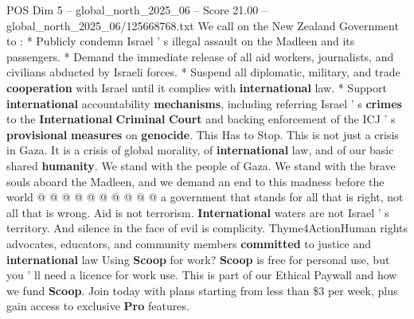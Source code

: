 \begin{textsample}{POS Dim 5 – global\_north\_2025\_06 – Score 21.00 – global\_north\_2025\_06/125668768.txt}
We call on the New Zealand Government to : * Publicly condemn Israel ' s illegal assault on the Madleen and its passengers. * Demand the immediate release of all aid workers, journalists, and civilians abducted by Israeli forces. * Suspend all diplomatic, military, and trade \textbf{cooperation} with Israel until it complies with \textbf{international} law. * Support \textbf{international} accountability \textbf{mechanisms}, including referring Israel ' s \textbf{crimes} to the \textbf{International} \textbf{Criminal} \textbf{Court} and backing enforcement of the ICJ ' s \textbf{provisional} \textbf{measures} on \textbf{genocide}.
This Has to Stop.
This is not just a crisis in Gaza.
It is a crisis of global morality, of \textbf{international} law, and of our basic shared \textbf{humanity}.
We stand with the people of Gaza.
We stand with the brave souls aboard the Madleen, and we demand an end to this madness before the world @ @ @ @ @ @ @ @ @ @ a government that stands for all that is right, not all that is wrong.
Aid is not terrorism. \textbf{International} waters are not Israel ' s territory.
And silence in the face of evil is complicity.
Thyme4ActionHuman rights advocates, educators, and community members \textbf{committed} to justice and \textbf{international} law Using \textbf{Scoop} for work? \textbf{Scoop} is free for personal use, but you ' ll need a licence for work use.
This is part of our Ethical Paywall and how we fund \textbf{Scoop}.
Join today with plans starting from less than \$3 per week, plus gain access to exclusive \textbf{Pro} features.

\end{textsample}
